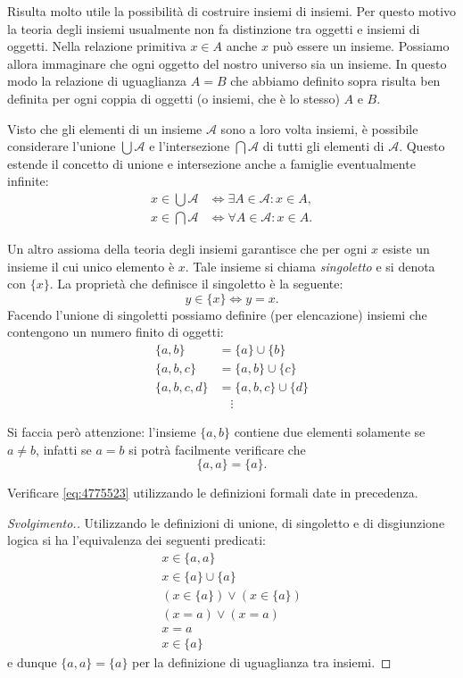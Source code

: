 Risulta molto utile la possibilità di costruire insiemi di insiemi.
Per questo motivo la teoria degli insiemi usualmente non fa distinzione
tra oggetti e insiemi di oggetti. Nella relazione primitiva $x\in A$ anche
$x$ può essere un insieme. Possiamo allora immaginare che ogni oggetto del
nostro universo sia un insieme. In questo modo la relazione di uguaglianza $A=B$
che abbiamo definito sopra risulta ben definita per ogni coppia di oggetti
(o insiemi, che è lo stesso) $A$ e $B$.

Visto che gli elementi di un insieme $\mathcal A$ sono a loro volta insiemi,
è possibile considerare l'unione $\bigcup \mathcal A$
e l'intersezione $\bigcap \mathcal A$ di tutti gli elementi
di $\mathcal A$.
Questo estende il concetto di unione e intersezione anche a famiglie
eventualmente infinite:
\begin{align*}
  x \in \bigcup \mathcal A & \iff \exists A \in \mathcal A \colon x\in A, \\
  x \in \bigcap \mathcal A & \iff \forall A \in \mathcal A \colon x\in A.
\end{align*}

Un altro assioma della teoria degli insiemi garantisce che per ogni
$x$ esiste un insieme il cui unico elemento è $x$. Tale insieme
si chiama \emph{singoletto} e si denota con $\{x\}$. La proprietà
che definisce il singoletto è la seguente:
\[
  y \in \{x\} \iff y=x.
\]
Facendo l'unione di singoletti possiamo definire (per elencazione) insiemi che contengono
un numero finito di oggetti:
\begin{align*}
  \{a,b\} &= \{a\} \cup \{b\} \\
  \{a, b, c\} &= \{a,b\} \cup \{c\}\\
  \{a, b, c, d\} &= \{a,b,c\} \cup \{d\}\\
  &\quad\vdots
\end{align*}

Si faccia però attenzione: l'insieme $\{a,b\}$ contiene due elementi
solamente se $a\neq b$, infatti se $a=b$ si potrà facilmente verificare
che
\begin{equation}\label{eq:4775523}
\{a,a\} = \{a\}.
\end{equation}

\begin{exercise}
  Verificare \eqref{eq:4775523} utilizzando le definizioni formali date in precedenza.
\end{exercise}
\begin{proof}[Svolgimento.]
Utilizzando le definizioni di unione, di singoletto e di disgiunzione logica
si ha l'equivalenza dei seguenti
predicati:
\begin{gather*}
  x \in \{a,a\}  \\
  x \in \{a\} \cup \{a\}\\
  (x \in \{a\}) \lor (x \in \{a\})\\
  (x = a) \lor (x = a) \\
  x = a \\
  x \in \{a\}
\end{gather*}
e dunque $\{a,a\}=\{a\}$ per la definizione di uguaglianza tra insiemi.
\end{proof}

